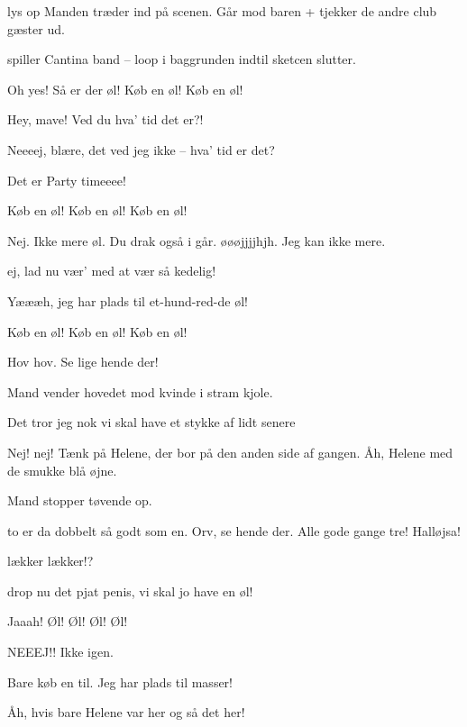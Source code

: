 \documentclass[a4paper,11pt]{article}
\begin{document}
\begin{sketch}

\scene lys op
\scene Manden træder ind på scenen. Går mod baren + tjekker de andre club gæster ud.

 spiller Cantina band -- loop i baggrunden indtil sketcen slutter.

 Oh yes! Så er der øl! Køb en øl! Køb en øl!

 Hey, mave! Ved du hva' tid det er?!

 Neeeej, blære, det ved jeg ikke -- hva' tid er det?

 Det er Party timeeee!

 Køb en øl! Køb en øl! Køb en øl!

 Nej. Ikke mere øl. Du drak også i går. øøøjjjjhjh. Jeg kan ikke mere.

 ej, lad nu vær' med at vær så kedelig!

 Yæææh, jeg har plads til et-hund-red-de øl!

 Køb en øl! Køb en øl! Køb en øl!

 Hov hov. Se lige hende der!

\scene Mand vender hovedet mod kvinde i stram kjole.

 Det tror jeg nok vi skal have et stykke af lidt senere

 Nej! nej! Tænk på Helene, der bor på den anden side af gangen. Åh, Helene med de smukke blå øjne.

\scene Mand stopper tøvende op.

 to er da dobbelt så godt som en. Orv, se hende der. Alle gode gange tre! Halløjsa!


 lækker lækker!?

 drop nu det pjat penis, vi skal jo have en øl!


 Jaaah! Øl! Øl! Øl! Øl!

 NEEEJ!! Ikke igen.


 Bare køb en til. Jeg har plads til masser!

 Åh, hvis bare Helene var her og så det her!


\end{sketch}
\end{document}
